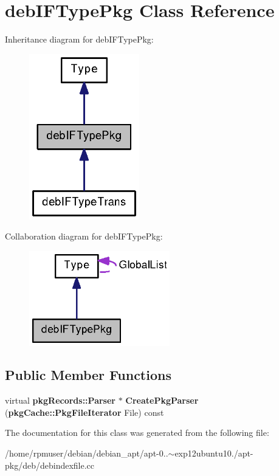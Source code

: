 \section{deb\-I\-F\-Type\-Pkg \-Class \-Reference}
\label{classdebIFTypePkg}


\-Inheritance diagram for deb\-I\-F\-Type\-Pkg\-:
\nopagebreak
\begin{figure}[H]
\begin{center}
\leavevmode
\includegraphics[width=136pt]{classdebIFTypePkg__inherit__graph}
\end{center}
\end{figure}


\-Collaboration diagram for deb\-I\-F\-Type\-Pkg\-:
\nopagebreak
\begin{figure}[H]
\begin{center}
\leavevmode
\includegraphics[width=173pt]{classdebIFTypePkg__coll__graph}
\end{center}
\end{figure}
\subsection*{\-Public \-Member \-Functions}
\begin{DoxyCompactItemize}
\item 
virtual {\bf pkg\-Records\-::\-Parser} $\ast$ {\bfseries \-Create\-Pkg\-Parser} ({\bf pkg\-Cache\-::\-Pkg\-File\-Iterator} \-File) const \label{classdebIFTypePkg_a5c7bfcd901abdb70ec482bc768d0d7fa}

\end{DoxyCompactItemize}


\-The documentation for this class was generated from the following file\-:\begin{DoxyCompactItemize}
\item 
/home/rpmuser/debian/debian\-\_\-apt/apt-\/0..$\sim$exp12ubuntu10./apt-\/pkg/deb/debindexfile.\-cc\end{DoxyCompactItemize}
